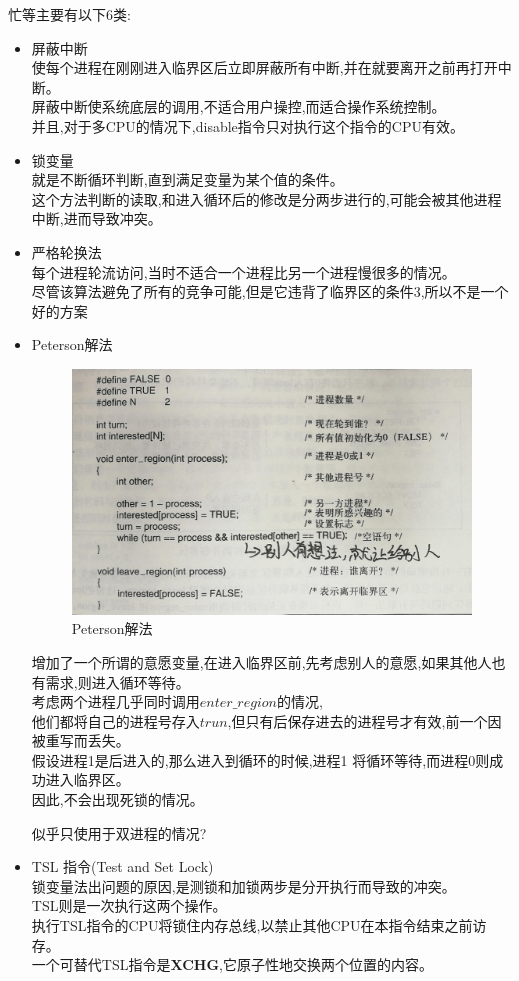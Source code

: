 \documentclass[UTF8,a4paper]{ctexart}
\begin{document}
忙等主要有以下6类:
\begin{itemize}
	\item 屏蔽中断\\
	      使每个进程在刚刚进入临界区后立即屏蔽所有中断,并在就要离开之前再打开中断。\\
	      屏蔽中断使系统底层的调用,不适合用户操控,而适合操作系统控制。\\
	      并且,对于多CPU的情况下,disable指令只对执行这个指令的CPU有效。
	\item 锁变量\\
	      就是不断循环判断,直到满足变量为某个值的条件。\\
	      这个方法判断的读取,和进入循环后的修改是分两步进行的,可能会被其他进程中断,进而导致冲突。
	\item 严格轮换法\\
	      每个进程轮流访问,当时不适合一个进程比另一个进程慢很多的情况。\\
	      尽管该算法避免了所有的竞争可能,但是它违背了临界区的条件3,所以不是一个好的方案
	\item Peterson解法
	      \begin{figure}[H]\centering
		      \includegraphics[scale = 0.2]{assets/ModernOperatingSystems_97ad7.png}
		      \caption{Peterson解法}
	      \end{figure}
	      增加了一个所谓的意愿变量,在进入临界区前,先考虑别人的意愿,如果其他人也有需求,则进入循环等待。\\
	      考虑两个进程几乎同时调用$enter\_region$的情况,\\
	      他们都将自己的进程号存入$trun$,但只有后保存进去的进程号才有效,前一个因被重写而丢失。\\
	      假设进程1是后进入的,那么进入到循环的时候,进程1 将循环等待,而进程0则成功进入临界区。\\
	      因此,不会出现死锁的情况。

	      {\color{blue}似乎只使用于双进程的情况?}
	\item TSL 指令(Test and Set Lock)\\
	      锁变量法出问题的原因,是测锁和加锁两步是分开执行而导致的冲突。\\
	      TSL则是一次执行这两个操作。\\
	      执行TSL指令的CPU将锁住内存总线,以禁止其他CPU在本指令结束之前访存。\\
	      一个可替代TSL指令是\textbf{XCHG},它原子性地交换两个位置的内容。
\end{itemize}
\end{document}
